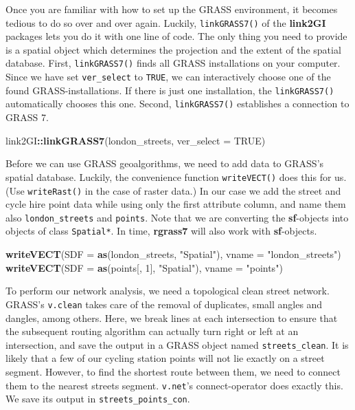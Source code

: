 \documentclass[]{krantz}
\newenvironment{Shaded}{\begin{snugshade}}{\end{snugshade}}
\newcommand{\DataTypeTok}[1]{\textcolor[rgb]{0.27,0.27,0.27}{#1}}
\newcommand{\DecValTok}[1]{\textcolor[rgb]{0.06,0.06,0.06}{#1}}
\newcommand{\KeywordTok}[1]{\textcolor[rgb]{0.27,0.27,0.27}{\textbf{#1}}}
\newcommand{\NormalTok}[1]{#1}
\newcommand{\OperatorTok}[1]{\textcolor[rgb]{0.43,0.43,0.43}{\textbf{#1}}}
\newcommand{\OtherTok}[1]{\textcolor[rgb]{0.37,0.37,0.37}{#1}}
\newcommand{\StringTok}[1]{\textcolor[rgb]{0.5,0.5,0.5}{#1}}
\begin{document}
Once you are familiar with how to set up the GRASS environment, it becomes tedious to do so over and over again.
Luckily, \texttt{linkGRASS7()} of the \textbf{link2GI} packages lets you do it with one line of code.
The only thing you need to provide is a spatial object which determines the projection and the extent of the spatial database.
First, \texttt{linkGRASS7()} finds all GRASS installations on your computer.
Since we have set \texttt{ver\_select} to \texttt{TRUE}, we can interactively choose one of the found GRASS-installations.
If there is just one installation, the \texttt{linkGRASS7()} automatically chooses this one.
Second, \texttt{linkGRASS7()} establishes a connection to GRASS 7.

\begin{Shaded}
\begin{Highlighting}[]
\NormalTok{link2GI}\OperatorTok{::}\KeywordTok{linkGRASS7}\NormalTok{(london_streets, }\DataTypeTok{ver_select =} \OtherTok{TRUE}\NormalTok{)}
\end{Highlighting}
\end{Shaded}

Before we can use GRASS geoalgorithms, we need to add data to GRASS's spatial database.
Luckily, the convenience function \texttt{writeVECT()} does this for us.
(Use \texttt{writeRast()} in the case of raster data.)
In our case we add the street and cycle hire point data while using only the first attribute column, and name them also \texttt{london\_streets} and \texttt{points}.
Note that we are converting the \textbf{sf}-objects into objects of class \texttt{Spatial*}.
In time, \textbf{rgrass7} will also work with \textbf{sf}-objects.

\begin{Shaded}
\begin{Highlighting}[]
\KeywordTok{writeVECT}\NormalTok{(}\DataTypeTok{SDF =} \KeywordTok{as}\NormalTok{(london_streets, }\StringTok{"Spatial"}\NormalTok{), }\DataTypeTok{vname =} \StringTok{"london_streets"}\NormalTok{)}
\KeywordTok{writeVECT}\NormalTok{(}\DataTypeTok{SDF =} \KeywordTok{as}\NormalTok{(points[, }\DecValTok{1}\NormalTok{], }\StringTok{"Spatial"}\NormalTok{), }\DataTypeTok{vname =} \StringTok{"points"}\NormalTok{)}
\end{Highlighting}
\end{Shaded}

To perform our network analysis, we need a topological clean street network.
GRASS's \texttt{v.clean} takes care of the removal of duplicates, small angles and dangles, among others.
Here, we break lines at each intersection to ensure that the subsequent routing algorithm can actually turn right or left at an intersection, and save the output in a GRASS object named \texttt{streets\_clean}.
It is likely that a few of our cycling station points will not lie exactly on a street segment.
However, to find the shortest route between them, we need to connect them to the nearest streets segment.
\texttt{v.net}'s connect-operator does exactly this.
We save its output in \texttt{streets\_points\_con}.
\end{document}
